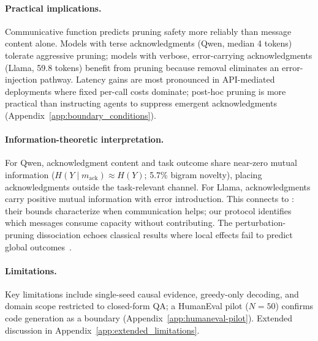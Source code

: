 \paragraph{Practical implications.}
Communicative function predicts pruning safety more reliably than message content alone. Models with terse acknowledgments (Qwen, median 4 tokens) tolerate aggressive pruning; models with verbose, error-carrying acknowledgments (Llama, 59.8 tokens) benefit from pruning because removal eliminates an error-injection pathway. Latency gains are most pronounced in API-mediated deployments where fixed per-call costs dominate; post-hoc pruning is more practical than instructing agents to suppress emergent acknowledgments (Appendix~\ref{app:boundary_conditions}).

\paragraph{Information-theoretic interpretation.}
For Qwen, acknowledgment content and task outcome share near-zero mutual information ($H(Y \mid m_{\mathrm{ack}}) \approx H(Y)$; 5.7\% bigram novelty), placing acknowledgments outside the task-relevant channel. For Llama, acknowledgments carry positive mutual information with error introduction. This connects to \citet{rizvi_martel_communication_2026}: their bounds characterize when communication helps; our protocol identifies which messages consume capacity without contributing. The perturbation-pruning dissociation echoes classical results where local effects fail to predict global outcomes~\citep{lecun_obd_1990, braess_1968}.

\paragraph{Limitations.}
Key limitations include single-seed causal evidence, greedy-only decoding, and domain scope restricted to closed-form QA; a HumanEval pilot ($N{=}50$) confirms code generation as a boundary (Appendix~\ref{app:humaneval-pilot}). Extended discussion in Appendix~\ref{app:extended_limitations}.
